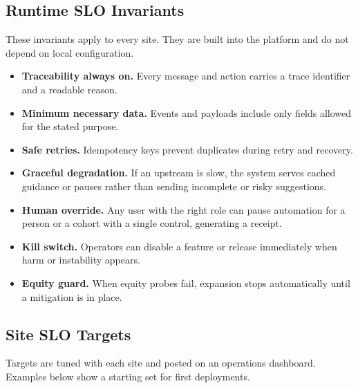\documentclass[12pt]{article}
\begin{document}
\subsection*{Runtime SLO Invariants}
These invariants apply to every site. They are built into the platform and do not depend on local configuration.
\begin{itemize}[leftmargin=*]
  \item \textbf{Traceability always on.} Every message and action carries a trace identifier and a readable reason.
  \item \textbf{Minimum necessary data.} Events and payloads include only fields allowed for the stated purpose.
  \item \textbf{Safe retries.} Idempotency keys prevent duplicates during retry and recovery.
  \item \textbf{Graceful degradation.} If an upstream is slow, the system serves cached guidance or pauses rather than sending incomplete or risky suggestions.
  \item \textbf{Human override.} Any user with the right role can pause automation for a person or a cohort with a single control, generating a receipt.
  \item \textbf{Kill switch.} Operators can disable a feature or release immediately when harm or instability appears.
  \item \textbf{Equity guard.} When equity probes fail, expansion stops automatically until a mitigation is in place.
\end{itemize}

\subsection*{Site SLO Targets}
Targets are tuned with each site and posted on an operations dashboard. Examples below show a starting set for first deployments.
\end{document}
